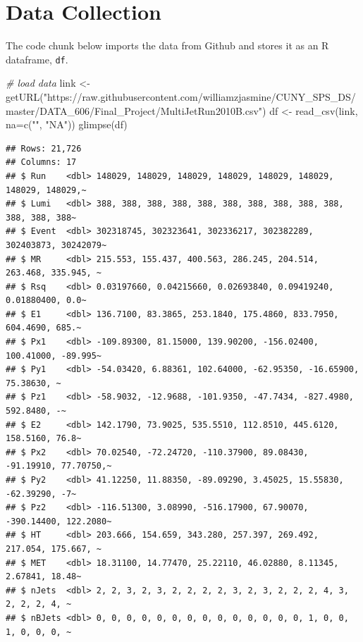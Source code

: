 \documentclass[
]{article}
\newenvironment{Shaded}{\begin{snugshade}}{\end{snugshade}}
\newcommand{\AttributeTok}[1]{\textcolor[rgb]{0.77,0.63,0.00}{#1}}
\newcommand{\CommentTok}[1]{\textcolor[rgb]{0.56,0.35,0.01}{\textit{#1}}}
\newcommand{\FunctionTok}[1]{\textcolor[rgb]{0.00,0.00,0.00}{#1}}
\newcommand{\NormalTok}[1]{#1}
\newcommand{\OtherTok}[1]{\textcolor[rgb]{0.56,0.35,0.01}{#1}}
\newcommand{\StringTok}[1]{\textcolor[rgb]{0.31,0.60,0.02}{#1}}
\begin{document}
\hypertarget{data-collection}{%
\section{Data Collection}\label{data-collection}}

The code chunk below imports the data from Github and stores it as an R
dataframe, \texttt{df}.

\begin{Shaded}
\begin{Highlighting}[]
\CommentTok{\# load data}
\NormalTok{link }\OtherTok{\textless{}{-}} \FunctionTok{getURL}\NormalTok{(}\StringTok{"https://raw.githubusercontent.com/williamzjasmine/CUNY\_SPS\_DS/master/DATA\_606/Final\_Project/MultiJetRun2010B.csv"}\NormalTok{)}
\NormalTok{df }\OtherTok{\textless{}{-}} \FunctionTok{read\_csv}\NormalTok{(link, }\AttributeTok{na=}\FunctionTok{c}\NormalTok{(}\StringTok{""}\NormalTok{, }\StringTok{"NA"}\NormalTok{))}
\FunctionTok{glimpse}\NormalTok{(df)}
\end{Highlighting}
\end{Shaded}

\begin{verbatim}
## Rows: 21,726
## Columns: 17
## $ Run    <dbl> 148029, 148029, 148029, 148029, 148029, 148029, 148029, 148029,~
## $ Lumi   <dbl> 388, 388, 388, 388, 388, 388, 388, 388, 388, 388, 388, 388, 388~
## $ Event  <dbl> 302318745, 302323641, 302336217, 302382289, 302403873, 30242079~
## $ MR     <dbl> 215.553, 155.437, 400.563, 286.245, 204.514, 263.468, 335.945, ~
## $ Rsq    <dbl> 0.03197660, 0.04215660, 0.02693840, 0.09419240, 0.01880400, 0.0~
## $ E1     <dbl> 136.7100, 83.3865, 253.1840, 175.4860, 833.7950, 604.4690, 685.~
## $ Px1    <dbl> -109.89300, 81.15000, 139.90200, -156.02400, 100.41000, -89.995~
## $ Py1    <dbl> -54.03420, 6.88361, 102.64000, -62.95350, -16.65900, 75.38630, ~
## $ Pz1    <dbl> -58.9032, -12.9688, -101.9350, -47.7434, -827.4980, 592.8480, -~
## $ E2     <dbl> 142.1790, 73.9025, 535.5510, 112.8510, 445.6120, 158.5160, 76.8~
## $ Px2    <dbl> 70.02540, -72.24720, -110.37900, 89.08430, -91.19910, 77.70750,~
## $ Py2    <dbl> 41.12250, 11.88350, -89.09290, 3.45025, 15.55830, -62.39290, -7~
## $ Pz2    <dbl> -116.51300, 3.08990, -516.17900, 67.90070, -390.14400, 122.2080~
## $ HT     <dbl> 203.666, 154.659, 343.280, 257.397, 269.492, 217.054, 175.667, ~
## $ MET    <dbl> 18.31100, 14.77470, 25.22110, 46.02880, 8.11345, 2.67841, 18.48~
## $ nJets  <dbl> 2, 2, 3, 2, 3, 2, 2, 2, 2, 3, 2, 3, 2, 2, 2, 4, 3, 2, 2, 2, 4, ~
## $ nBJets <dbl> 0, 0, 0, 0, 0, 0, 0, 0, 0, 0, 0, 0, 0, 0, 1, 0, 0, 1, 0, 0, 0, ~
\end{verbatim}
\end{document}
